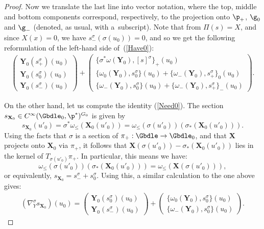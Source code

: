 \begin{proof}
 Now we translate the last line into vector notation, where the top, middle and bottom components correspond, respectively, to the projection onto $\p_+$, $\g_0$ and $\g_-$ (denoted, as usual, with a~subscript). Note that from $\Pi(s) = X$, and since $X(x) = 0$, we have $s^{\sigma}_-(\sigma(u_0)) = 0$, and so we get the following reformulation of the left-hand side of~(\ref{Have0}):
\begin{gather}
\left(\begin{array}{c}
    \mathbf{Y}_0(s^{\sigma}_+)(u_0) \\
    \mathbf{Y}_0(s^{\sigma}_0)(u_0) \\
    \mathbf{Y}_0(s^{\sigma}_-)(u_0)\end{array}\right) +
\left(\begin{array}{c}
    \{\sigma^*\omega(\mathbf{Y}_0),[s]^{\sigma}\}_+(u_0) \\
    \{\omega_0(\mathbf{Y}_0),s_0^{\sigma}\}(u_0) + \{\omega_{-}(\mathbf{Y}_0),s^{\sigma}_+\}_0(u_0) \\
    \{\omega_{-}(\mathbf{Y}_0),s^{\sigma}_0\}(u_0) +
    \{\omega_{-}(\mathbf{Y}_0),s^{\sigma}_+\}_-(u_0)
     \end{array}\right). \label{Have0 wrt sigma}
\end{gather}

On the other hand, let us compute the identity (\ref{Need0}). The section $s_{\mathbf{X}_0} \in C^{\infty}(\Gbdle_0,\p^*)^{G_0}$ is given by
\[
s_{\mathbf{X}_0}(u'_0) = \sigma^* \omega_{\leq}(\mathbf{X}_0(u'_0)) = \omega_{\leq}(\sigma(u'_0))(\sigma_*(\mathbf{X}_0(u'_0))).
\]
Using the facts that $\sigma$ is a section of $\pi_+:\Gbdle \rightarrow \Gbdle_0$, and that $\mathbf{X}$ projects onto $\mathbf{X}_0$ via $\pi_+$, it follows that $\mathbf{X}(\sigma(u'_0)) - \sigma_*(\mathbf{X}_0(u'_0))$ lies in the kernel of $T_{\sigma(u'_0)} \pi_+$. In particular, this means we have:
\[
\omega_{\leq}(\sigma(u'_0))(\sigma_*(\mathbf{X}_0(u'_0))) = \omega_{\leq}(\mathbf{X}(\sigma(u'_0))),
\]
or equivalently, $s_{\mathbf{X}_0} = s^{\sigma}_- + s^{\sigma}_0$. Using this, a similar calculation to the one above gives:
\begin{gather}
(\nabla^{\sigma}_Y s_{\mathbf{X}_0})(u_0) =
    \left(\begin{array}{c}
    \mathbf{Y}_0(s^{\sigma}_0)(u_0) \\
    \mathbf{Y}_0(s^{\sigma}_-)(u_0)\end{array}\right) +
    \left(\begin{array}{c}
    \{\omega_0(\mathbf{Y}_0),s_0^{\sigma}\}(u_0) \\
    \{\omega_{-}(\mathbf{Y}_0),s^{\sigma}_0\}(u_0) \end{array}\right).
\label{Need0 wrt sigma}
\end{gather}


\end{proof}
